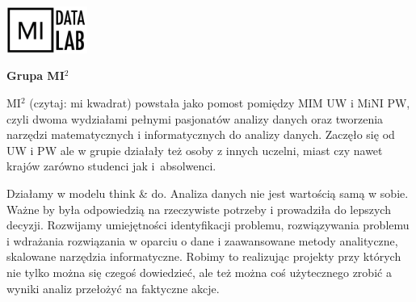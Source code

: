 \documentclass[\main/boa.tex]{subfiles}
\begin{document}
	\begin{minipage}[t]{0.915\textwidth}
		\center     
		\includegraphics[width=100px]{img/logos.bw/mi2_data_lab_napis.png} 
	\end{minipage}
\begin{center}
\Large \textbf {Grupa MI$^{2}$}
\end{center}

\vskip 0.3cm
\normalsize 
MI$^{2}$ (czytaj: mi kwadrat) powstała jako pomost pomiędzy MIM UW i MiNI PW, czyli dwoma wydziałami pełnymi pasjonatów analizy danych oraz tworzenia narzędzi matematycznych i informatycznych do analizy danych. Zaczęło się od UW i PW ale w grupie działały też osoby z innych uczelni, miast czy nawet krajów zarówno studenci jak i~absolwenci.

Działamy w modelu think \& do. Analiza danych nie jest wartością samą w sobie. Ważne by była odpowiedzią na rzeczywiste potrzeby i prowadziła do lepszych decyzji. Rozwijamy umiejętności identyfikacji problemu, rozwiązywania problemu i wdrażania rozwiązania w oparciu o dane i zaawansowane metody analityczne, skalowane narzędzia informatyczne. Robimy to realizując projekty przy których nie tylko można się czegoś dowiedzieć, ale też można coś użytecznego zrobić a wyniki analiz przełożyć na faktyczne akcje.
\end{document}
